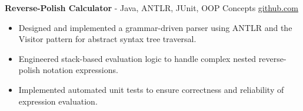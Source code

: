 \documentclass[11pt]{article}       %
\begin{document}
\textbf{Reverse-Polish Calculator}{ - Java, ANTLR, JUnit, OOP Concepts} \hfill \href{https://github.com/Monica20030707/reverse-Polish_calculator}{github.com} \\
\vspace{-9pt}
\begin{itemize}
  \item Designed and implemented a grammar-driven parser using ANTLR and the Visitor pattern for abstract syntax tree traversal.
  \item Engineered stack-based evaluation logic to handle complex nested reverse-polish notation expressions.
  \item Implemented automated unit tests to ensure correctness and reliability of expression evaluation.
\end{itemize}

\end{document}
